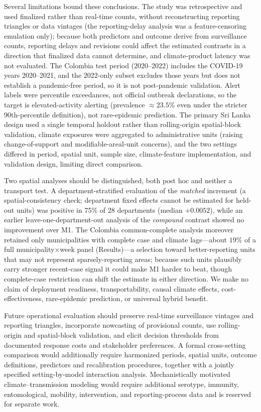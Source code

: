\documentclass[11pt,a4paper]{article}
\begin{document}
Several limitations bound these conclusions. The study was retrospective and used finalized rather than real-time counts, without reconstructing reporting triangles or data vintages (the reporting-delay analysis was a feature-censoring emulation only); because both predictors and outcome derive from surveillance counts, reporting delays and revisions could affect the estimated contrasts in a direction that finalized data cannot determine, and climate-product latency was not evaluated. The Colombia test period (2020--2022) includes the COVID-19 years 2020--2021, and the 2022-only subset excludes those years but does not establish a pandemic-free period, so it is not post-pandemic validation. Alert labels were percentile exceedances, not official outbreak declarations, so the target is elevated-activity alerting (prevalence $\approx23.5\%$ even under the stricter 90th-percentile definition), not rare-epidemic prediction. The primary Sri Lanka design used a single temporal holdout rather than rolling-origin spatial-block validation, climate exposures were aggregated to administrative units (raising change-of-support and modifiable-areal-unit concerns), and the two settings differed in period, spatial unit, sample size, climate-feature implementation, and validation design, limiting direct comparison.

Two spatial analyses should be distinguished, both post hoc and neither a transport test. A department-stratified evaluation of the \emph{matched} increment (a spatial-consistency check; department fixed effects cannot be estimated for held-out units) was positive in 75\% of 28 departments (median $+0.0052$), while an earlier leave-one-department-out analysis of the \emph{compound} contrast showed no improvement over M1. The Colombia common-complete analysis moreover retained only municipalities with complete case and climate lags---about $19\%$ of a full municipality$\times$week panel (Results)---a selection toward better-reporting units that may not represent sparsely-reporting areas; because such units plausibly carry stronger recent-case signal it could make M1 harder to beat, though complete-case restriction can shift the estimate in either direction. We make no claim of deployment readiness, transportability, causal climate effects, cost-effectiveness, rare-epidemic prediction, or universal hybrid benefit.

Future operational evaluation should preserve real-time surveillance vintages and reporting triangles, incorporate nowcasting of provisional counts, use rolling-origin and spatial-block validation, and elicit decision thresholds from documented response costs and stakeholder preferences. A formal cross-setting comparison would additionally require harmonized periods, spatial units, outcome definitions, predictors and recalibration procedures, together with a jointly specified setting-by-model interaction analysis. Mechanistically motivated climate--transmission modeling would require additional serotype, immunity, entomological, mobility, intervention, and reporting-process data and is reserved for separate work.
\end{document}

